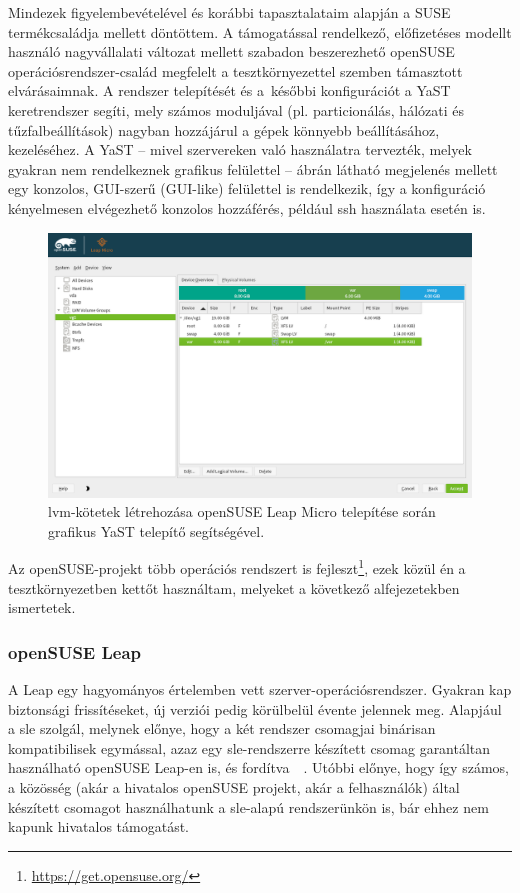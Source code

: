Mindezek figyelembevételével és korábbi tapasztalataim alapján a SUSE termékcsaládja mellett döntöttem. A támogatással rendelkező, előfizetéses modellt használó nagyvállalati változat mellett szabadon beszerezhető openSUSE operációsrendszer-család megfelelt a tesztkörnyezettel szemben támasztott elvárásaimnak. A rendszer telepítését és a~későbbi konfigurációt a YaST keretrendszer segíti, mely számos moduljával (pl. particionálás, hálózati és tűzfalbeállítások) nagyban hozzájárul a gépek könnyebb beállításához, kezeléséhez. A YaST -- mivel szervereken való használatra tervezték, melyek gyakran nem rendelkeznek grafikus felülettel --  ábrán látható megjelenés mellett egy konzolos, GUI-szerű (GUI-like) felülettel is rendelkezik, így a konfiguráció kényelmesen elvégezhető konzolos hozzáférés, például \acrshort{ssh} használata esetén is.

\begin{figure}[!ht]
	\centering
	\includegraphics[width=15cm]{figures/yast-partitioner.png}
	\caption{\acrshort{lvm}-kötetek létrehozása openSUSE Leap Micro telepítése során grafikus YaST telepítő segítségével.}
	\label{fig:yast-partitioner}
\end{figure}

Az openSUSE-projekt több operációs rendszert is fejleszt\footnote{\url{https://get.opensuse.org/}}, ezek közül én a tesztkörnyezetben kettőt használtam, melyeket a következő alfejezetekben ismertetek.

\subsubsection{openSUSE Leap}
A Leap egy hagyományos értelemben vett szerver-operációsrendszer. Gyakran kap biztonsági frissítéseket, új verziói pedig körülbelül évente jelennek meg. Alapjául a \acrfull{sle} szolgál, melynek előnye, hogy a két rendszer csomagjai binárisan kompatibilisek egymással, azaz egy \acrshort{sle}-rendszerre készített csomag garantáltan használható openSUSE Leap-en is, és fordítva~\cite{openSUSELeap15SP3intro}~\cite{SLE15SP3intro}. Utóbbi előnye, hogy így számos, a közösség (akár a hivatalos openSUSE projekt, akár a felhasználók) által készített csomagot használhatunk a \acrshort{sle}-alapú rendszerünkön is, bár ehhez nem kapunk hivatalos támogatást.

